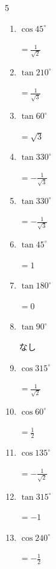 \begin{multicols}{5}
\begin{enumerate}
        $\displaystyle =-\frac{\sqrt{3}}{2}$

  \item $\displaystyle \cos{45^\circ}$

        $\displaystyle =\frac{1}{\sqrt{2}}$

  \item $\displaystyle \tan{210^\circ}$

        $\displaystyle =\frac{1}{\sqrt{3}}$

  \item $\displaystyle \tan{60^\circ}$

        $\displaystyle =\sqrt{3}$

  \item $\displaystyle \tan{330^\circ}$

        $\displaystyle =-\frac{1}{\sqrt{3}}$

  \item $\displaystyle \tan{330^\circ}$

        $\displaystyle =-\frac{1}{\sqrt{3}}$

  \item $\displaystyle \tan{45^\circ}$

        $\displaystyle =1$

  \item $\displaystyle \tan{180^\circ}$

        $\displaystyle =0$

  \item $\displaystyle \tan{90^\circ}$

        $\displaystyle なし$

  \item $\displaystyle \cos{315^\circ}$

        $\displaystyle =\frac{1}{\sqrt{2}}$

  \item $\displaystyle \cos{60^\circ}$

        $\displaystyle =\frac{1}{2}$

  \item $\displaystyle \cos{135^\circ}$

        $\displaystyle =-\frac{1}{\sqrt{2}}$

  \item $\displaystyle \tan{315^\circ}$

        $\displaystyle =-1$

  \item $\displaystyle \cos{240^\circ}$

        $\displaystyle =-\frac{1}{2}$


\end{enumerate}
\end{multicols}

